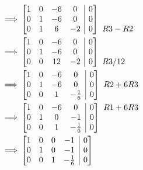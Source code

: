 \documentclass[11pt]{article}
\begin{document}
\begin{align*}
\begin{array}{c}
    \;
\end{array} \\
\implies & \left[\begin{array}{@{}cccc|c@{}}
    1 & 0 & -6 & 0 & 0\\
    0 & 1 & -6 & 0 & 0\\
    0 & 1 & 6 & -2 & 0
\end{array} \right]
\begin{array}{c}
    \\
    \!\\
    \! R3-R2
\end{array} \\
\implies & \left[\begin{array}{@{}cccc|c@{}}
    1 & 0 & -6 & 0 & 0\\
    0 & 1 & -6 & 0 & 0\\
    0 & 0 & 12 & -2 & 0
\end{array} \right]
\begin{array}{c}
    \\
    \!\\
    \! R3/12
\end{array} \\
\implies & \left[\begin{array}{@{}cccc|c@{}}
    1 & 0 & -6 & 0 & 0\\
    0 & 1 & -6 & 0 & 0\\
    0 & 0 & 1 & -\frac{1}{6} & 0
\end{array} \right]
\begin{array}{c}
    \\
    \!R2 + 6R3\\
    \!
\end{array} \\
\implies & \left[\begin{array}{@{}cccc|c@{}}
    1 & 0 & -6 & 0 & 0\\
    0 & 1 & 0 & -1 & 0\\
    0 & 0 & 1 & -\frac{1}{6} & 0
\end{array} \right]
\begin{array}{c}
    \! R1 + 6R3 \\
    \!\\
    \!
\end{array} \\
\implies & \left[\begin{array}{@{}cccc|c@{}}
    1 & 0 & 0 & -1 & 0\\
    0 & 1 & 0 & -1 & 0\\
    0 & 0 & 1 & -\frac{1}{6}& 0
\end{array} \right]
\end{align*}
\end{document}
